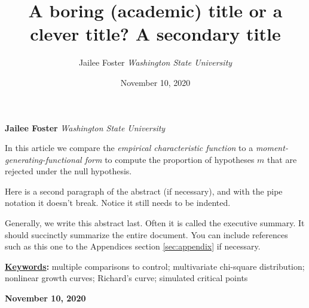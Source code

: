 \documentclass[]{article}
\title{\textbf{\textcolor{WSU.crimson}{A boring (academic) title or a
clever title?}} \newline \textbf{\textcolor{WSU.gray}{A secondary
title}}  }
\author{\Large Jailee
Foster\vspace{0.05in} \newline\normalsize\emph{Washington State
University}  }
\date{November 10, 2020}
\newcommand*{\authorfont}{\fontfamily{phv}\selectfont}
\renewenvironment{abstract}
 {{%
    \setlength{\leftmargin}{0mm}
    \setlength{\rightmargin}{\leftmargin}%
  }%
  \relax}
 {\endlist}
\begin{document}
	
%    


{%
\setlength{\parindent}{0pt}
\thispagestyle{plain}
{\fontsize{18}{20}\selectfont\raggedright 
\maketitle  %

}

{
   \vskip 13.5pt\relax \normalsize\fontsize{11}{12} 
   
\textbf{\authorfont Jailee Foster} \hskip 15pt \emph{\small Washington
State University}   

}

}








\begin{abstract}

    \hbox{\vrule height .2pt width 39.14pc}

    \vskip 8.5pt %

\noindent In this article we compare the
\emph{empirical characteristic function} \citep{Tukey:1977, Becker:1988}
to a \emph{moment-generating-functional form} to compute the proportion
of hypotheses \(m\) that are rejected under the null hypothesis.
\vspace{0.25in}

\noindent Here is a second paragraph of the abstract (if necessary), and
with the pipe notation it doesn't break. Notice it still needs to be
indented. \vspace{0.25in}

\noindent Generally, we write this abstract last. Often it is called the
executive summary. It should succinctly summarize the entire document.
You can include references such as this one to the Appendices section
\ref{sec:appendix} if necessary.


\vskip 8.5pt \noindent \textbf{\underline{Keywords}:} multiple
comparisons to control; multivariate chi-square distribution; nonlinear
growth curves; Richard's curve; simulated critical points \par

    




    
    \hbox{\vrule height .2pt width 39.14pc}
    \vskip 5pt 
    \hfill \textbf{\textcolor{WSU.gray}{ November 10, 2020 } }
    \vskip 5pt 
    
\end{abstract}
\end{document}
